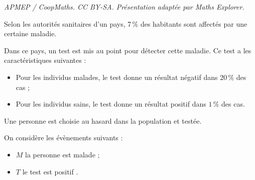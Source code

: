\documentclass[10pt]{article}
\begin{document}
\noindent\textit{APMEP / CoopMaths. CC BY-SA. Présentation adaptée par Maths Explorer.}\par\medskip
\medskip


Selon les autorités sanitaires d'un pays, 7\,\% des habitants sont affectés par une certaine maladie.

Dans ce pays, un test est mis au point pour détecter cette maladie. Ce test a les caractéristiques suivantes :
\setlength\parindent{1cm}
\begin{itemize}
\item[$\bullet~~$] Pour les individus malades, le test donne un résultat négatif dans $20 \,\%$ des cas ;
\item[$\bullet~~$] Pour les individus sains, le test donne un résultat positif dans $1\,\%$ des cas.
\end{itemize}
\setlength\parindent{0cm}

Une personne est choisie au hasard dans la population et testée.

On considère les évènements suivants :

\setlength\parindent{1cm}
\begin{itemize}
\item[$\bullet~~$] $M$ \og la personne est malade \fg{} ;
\item[$\bullet~~$]  $T$ \og le test est positif \fg{}.
\end{itemize}
\setlength\parindent{0cm}

\medskip
\end{document}
